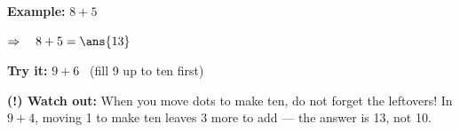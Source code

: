 \documentclass[12pt]{article}
\begin{document}
\begin{examplebox}
\textbf{Example:} \quad $8 + 5$

$\Rightarrow\quad 8 + 5 = \ans{13}$
\end{examplebox}

\begin{tryitbox}
\textbf{Try it:} \quad $9 + 6$ \ (fill 9 up to ten first)\\[2pt]
\end{tryitbox}

\begin{watchoutbox}
\textbf{(!) Watch out:} When you move dots to make ten, do not forget the
leftovers! In $9+4$, moving 1 to make ten leaves 3 more to add --- the answer
is 13, not 10.
\end{watchoutbox}
\end{document}
